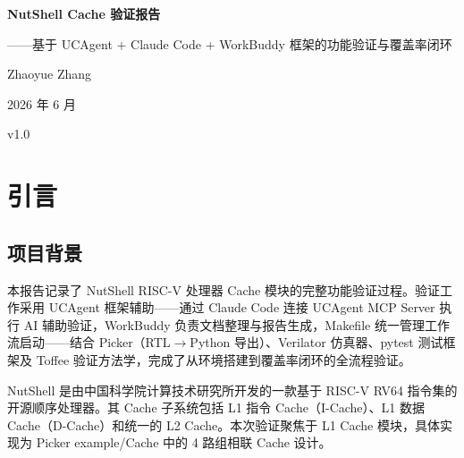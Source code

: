 \documentclass[12pt,a4paper]{ctexart}
\begin{document}
\thispagestyle{empty}
\begin{center}
  \vspace*{3cm}

  {\heiti{}\bfseries NutShell Cache 验证报告}

  \vspace{0.8cm}

  {\kaishu{}——基于 UCAgent + Claude Code + WorkBuddy 框架的功能验证与覆盖率闭环}

  \vspace{3cm}

  {\songti{} Zhaoyue Zhang}

  \vspace{1cm}

  {\songti{} 2026 年 6 月}

  \vspace{1cm}

  {\songti{} v1.0}

\end{center}

\newpage

\tableofcontents
\newpage

\section{引言}

\subsection{项目背景}

本报告记录了 NutShell RISC-V 处理器 Cache 模块的完整功能验证过程。验证工作采用 UCAgent 框架辅助——通过 Claude Code 连接 UCAgent MCP Server 执行 AI 辅助验证，WorkBuddy 负责文档整理与报告生成，Makefile 统一管理工作流启动——结合 Picker（RTL$\rightarrow$Python 导出）、Verilator 仿真器、pytest 测试框架及 Toffee 验证方法学，完成了从环境搭建到覆盖率闭环的全流程验证。

NutShell 是由中国科学院计算技术研究所开发的一款基于 RISC-V RV64 指令集的开源顺序处理器。其 Cache 子系统包括 L1 指令 Cache（I-Cache）、L1 数据 Cache（D-Cache）和统一的 L2 Cache。本次验证聚焦于 L1 Cache 模块，具体实现为 Picker example/Cache 中的 4 路组相联 Cache 设计。
\end{document}
